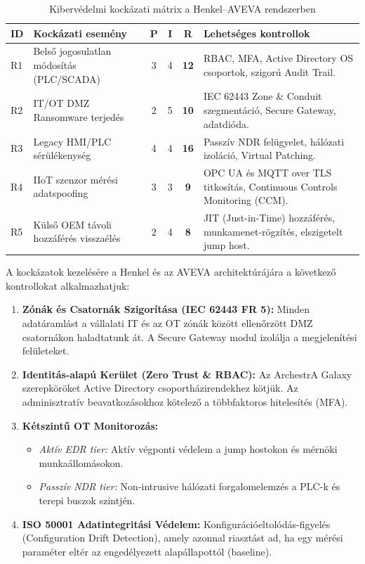  \begin{table}[h!] \centering \small \vspace{0.2cm} \begin{tabularx}{\textwidth}{lXcccX} \toprule \textbf{ID} & \textbf{Kockázati esemény} & \textbf{P} & \textbf{I} & \textbf{R} & \textbf{Lehetséges kontrollok}\\ 
 \midrule R1 & Belső jogosulatlan módosítás (PLC/SCADA) & 3 & 4 & \textbf{12} & RBAC, MFA, Active Directory OS csoportok, szigorú Audit Trail. \\
 R2 & IT/OT DMZ Ransomware terjedés & 2 & 5 & \textbf{10} & IEC 62443 Zone \& Conduit szegmentáció, Secure Gateway, adatdióda. \\
 R3 & Legacy HMI/PLC sérülékenység & 4 & 4 & \textbf{16} & Passzív NDR felügyelet, hálózati izoláció, Virtual Patching. \\
 R4 & IIoT szenzor mérési adatspoofing & 3 & 3 & \textbf{9} & OPC UA és MQTT over TLS titkosítás, Continuous Controls Monitoring (CCM). \\
 R5 & Külső OEM távoli hozzáférés visszaélés & 2 & 4 & \textbf{8} & JIT (Just-in-Time) hozzáférés, munkamenet-rögzítés, elszigetelt jump host. \\
\bottomrule
\end{tabularx} 
\caption{Kibervédelmi kockázati mátrix a Henkel--AVEVA rendszerben}
\end{table}
A kockázatok kezelésére a Henkel és az AVEVA architektúrájára a következő kontrollokat alkalmazhatjuk: 
\begin{enumerate} 
\item \textbf{Zónák és Csatornák Szigorítása (IEC 62443 FR 5):} Minden adatáramlást a vállalati IT és az OT zónák között ellenőrzött DMZ csatornákon haladtatunk át. A Secure Gateway modul izolálja a megjelenítési felületeket. 
\item \textbf{Identitás-alapú Kerület (Zero Trust \& RBAC):} Az ArchestrA Galaxy szerepköröket Active Directory csoportházirendekhez kötjük. Az adminisztratív beavatkozásokhoz kötelező a többfaktoros hitelesítés (MFA). 
\item \textbf{Kétszintű OT Monitorozás:} 
\begin{itemize} 
\item \emph{Aktív EDR tier:} Aktív végponti védelem a jump hostokon és mérnöki munkaállomásokon. 
\item \emph{Passzív NDR tier:} Non-intrusive hálózati forgalomelemzés a PLC-k és terepi buszok szintjén. 
\end{itemize} 
\item \textbf{ISO 50001 Adatintegritási Védelem:} Konfigurációeltolódás-figyelés (Configuration Drift Detection), amely azonnal riasztást ad, ha egy mérési paraméter eltér az engedélyezett alapállapottól (baseline). 
\end{enumerate}
